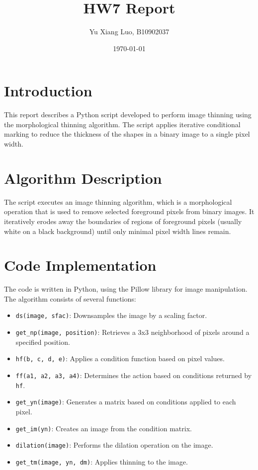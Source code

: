 \documentclass{article}
\title{HW7 Report}
\author{Yu Xiang Luo, B10902037}
\date{\today}
\begin{document}
\maketitle

\section{Introduction}
This report describes a Python script developed to perform image thinning using the morphological thinning algorithm. The script applies iterative conditional marking to reduce the thickness of the shapes in a binary image to a single pixel width.

\section{Algorithm Description}
The script executes an image thinning algorithm, which is a morphological operation that is used to remove selected foreground pixels from binary images. It iteratively erodes away the boundaries of regions of foreground pixels (usually white on a black background) until only minimal pixel width lines remain.

\section{Code Implementation}
The code is written in Python, using the Pillow library for image manipulation. The algorithm consists of several functions:

\begin{itemize}
    \item \texttt{ds(image, sfac)}: Downsamples the image by a scaling factor.
    \item \texttt{get\_np(image, position)}: Retrieves a 3x3 neighborhood of pixels around a specified position.
    \item \texttt{hf(b, c, d, e)}: Applies a condition function based on pixel values.
    \item \texttt{ff(a1, a2, a3, a4)}: Determines the action based on conditions returned by \texttt{hf}.
    \item \texttt{get\_yn(image)}: Generates a matrix based on conditions applied to each pixel.
    \item \texttt{get\_im(yn)}: Creates an image from the condition matrix.
    \item \texttt{dilation(image)}: Performs the dilation operation on the image.
    \item \texttt{get\_tm(image, yn, dm)}: Applies thinning to the image.
\end{itemize}
\end{document}
